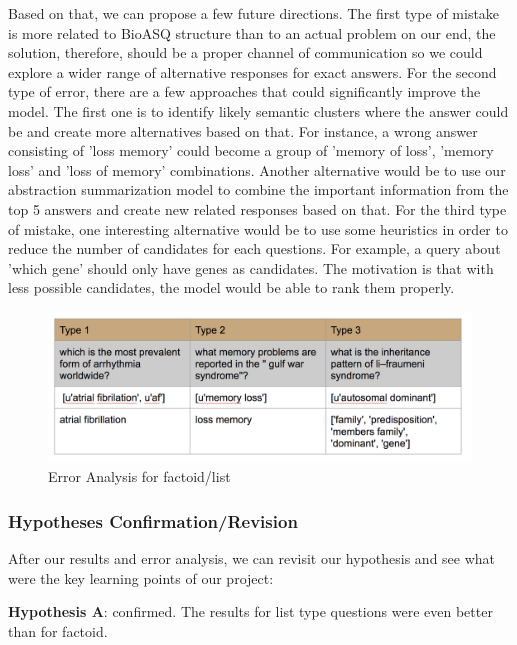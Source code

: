 Based on that, we can propose a few future directions. The first type of mistake is more related to BioASQ structure than to an actual problem on our end, the solution, therefore, should be a proper channel of communication so we could explore a wider range of alternative responses for exact answers. For the second type of error, there are a few approaches that could significantly improve the model. The first one is to identify likely semantic clusters where the answer could be and create more alternatives based on that. For instance, a wrong answer consisting of 'loss memory' could become a group of 'memory of loss', 'memory loss' and 'loss of memory' combinations. Another alternative would be to use our abstraction summarization model to combine the important information from the top 5 answers and create new related responses based on that. For the third type of mistake, one interesting alternative would be to use some heuristics in order to reduce the number of candidates for each questions. For example, a query about 'which gene' should only have genes as candidates. The motivation is that with less possible candidates, the model would be able to rank them properly.

\begin{figure}
    \centering
    \includegraphics[scale=0.4]{images/error_fl.png}
    \caption{Error Analysis for factoid/list}
    \label{fig:error_fl}
\end{figure}


\subsubsection{Hypotheses Confirmation/Revision}

After our results and error analysis, we can revisit our hypothesis and see what were the key learning points of our project:

\bigbreak 

\textbf{Hypothesis A}: confirmed. The results for list type questions were even better than for factoid. 

